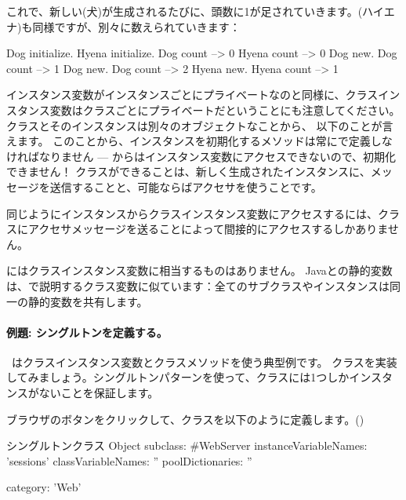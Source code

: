 \documentclass[a4paper,10pt,twoside]{book}
\begin{document}
これで、新しい(犬)が生成されるたびに、頭数に1が足されていきます。(ハイエナ)も同様ですが、別々に数えられていきます：
\begin{code}{}
Dog initialize.
Hyena initialize.
Dog count     --> 0
Hyena count --> 0
Dog new.
Dog count     --> 1
Dog new.
Dog count     --> 2
Hyena new.
Hyena count --> 1
\end{code}

インスタンス変数がインスタンスごとにプライベートなのと同様に、クラスインスタンス変数はクラスごとにプライベートだということにも注意してください。
クラスとそのインスタンスは別々のオブジェクトなことから、
以下のことが言えます。
このことから、インスタンスを初期化するメソッドは常にで定義しなければなりません --- からはインスタンス変数にアクセスできないので、初期化できません！
クラスができることは、新しく生成されたインスタンスに、メッセージを送信することと、可能ならばアクセサを使うことです。

同じようにインスタンスからクラスインスタンス変数にアクセスするには、クラスにアクセサメッセージを送ることによって間接的にアクセスするしかありません。

にはクラスインスタンス変数に相当するものはありません。
Javaとの静的変数は、で説明するクラス変数に似ています：全てのサブクラスやインスタンスは同一の静的変数を共有します。

\paragraph{例題: シングルトンを定義する。}
~\cite{Alpe98a}はクラスインスタンス変数とクラスメソッドを使う典型例です。
クラスを実装してみましょう。シングルトンパターンを使って、クラスには1つしかインスタンスがないことを保証します。

ブラウザのボタンをクリックして、クラスを以下のように定義します。()

\begin{classdef}[singleton]{シングルトンクラス}
Object subclass: #WebServer
	instanceVariableNames: 'sessions' 	
	classVariableNames: '' 	
	poolDictionaries: '' 	

	category: 'Web'
\end{classdef}
\end{document}
